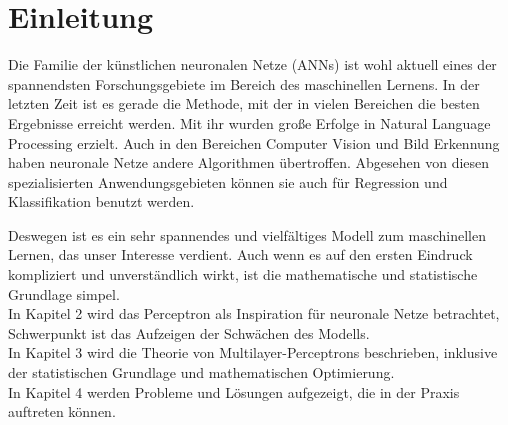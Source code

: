 \section{Einleitung}
Die Familie der künstlichen neuronalen Netze (ANNs) ist wohl aktuell eines der spannendsten Forschungsgebiete im Bereich des maschinellen Lernens. In der letzten Zeit ist es gerade die Methode, mit der in vielen Bereichen die besten Ergebnisse erreicht werden. 
Mit ihr wurden große Erfolge in Natural Language Processing erzielt. Auch in den Bereichen Computer Vision und Bild Erkennung haben neuronale Netze andere Algorithmen übertroffen\cite{LeCun2015}. Abgesehen von diesen spezialisierten Anwendungsgebieten können sie auch für Regression und Klassifikation benutzt werden.

Deswegen ist es ein sehr spannendes und vielfältiges Modell zum maschinellen Lernen, das unser Interesse verdient. Auch wenn es auf den ersten Eindruck kompliziert und unverständlich wirkt, ist die mathematische und statistische Grundlage simpel.\\
In Kapitel 2 wird das Perceptron als Inspiration für neuronale Netze betrachtet, Schwerpunkt ist das Aufzeigen der Schwächen des Modells. \\
In Kapitel 3 wird die Theorie von Multilayer-Perceptrons beschrieben, inklusive der statistischen Grundlage und mathematischen Optimierung. \\
In Kapitel 4 werden Probleme und Lösungen aufgezeigt, die in der Praxis auftreten können.
